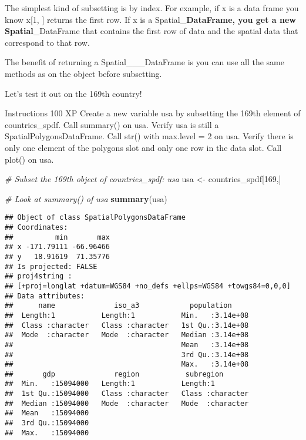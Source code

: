 \documentclass[]{article}
\newenvironment{Shaded}{\begin{snugshade}}{\end{snugshade}}
\newcommand{\CommentTok}[1]{\textcolor[rgb]{0.56,0.35,0.01}{\textit{#1}}}
\newcommand{\DecValTok}[1]{\textcolor[rgb]{0.00,0.00,0.81}{#1}}
\newcommand{\KeywordTok}[1]{\textcolor[rgb]{0.13,0.29,0.53}{\textbf{#1}}}
\newcommand{\NormalTok}[1]{#1}
\newcommand{\StringTok}[1]{\textcolor[rgb]{0.31,0.60,0.02}{#1}}
\begin{document}
The simplest kind of subsetting is by index. For example, if x is a data
frame you know x{[}1, {]} returns the first row. If x is a
Spatial\_\textbf{DataFrame, you get a new Spatial}\_DataFrame that
contains the first row of data and the spatial data that correspond to
that row.

The benefit of returning a Spatial\_\_\_DataFrame is you can use all the
same methods as on the object before subsetting.

Let's test it out on the 169th country!

Instructions 100 XP Create a new variable usa by subsetting the 169th
element of countries\_spdf. Call summary() on usa. Verify usa is still a
SpatialPolygonsDataFrame. Call str() with max.level = 2 on usa. Verify
there is only one element of the polygons slot and only one row in the
data slot. Call plot() on usa.

\begin{Shaded}
\begin{Highlighting}[]
\CommentTok{# Subset the 169th object of countries_spdf: usa}
\NormalTok{usa <-}\StringTok{ }\NormalTok{countries_spdf[}\DecValTok{169}\NormalTok{,]}

\CommentTok{# Look at summary() of usa}
\KeywordTok{summary}\NormalTok{(usa)}
\end{Highlighting}
\end{Shaded}

\begin{verbatim}
## Object of class SpatialPolygonsDataFrame
## Coordinates:
##          min       max
## x -171.79111 -66.96466
## y   18.91619  71.35776
## Is projected: FALSE 
## proj4string :
## [+proj=longlat +datum=WGS84 +no_defs +ellps=WGS84 +towgs84=0,0,0]
## Data attributes:
##      name              iso_a3            population      
##  Length:1           Length:1           Min.   :3.14e+08  
##  Class :character   Class :character   1st Qu.:3.14e+08  
##  Mode  :character   Mode  :character   Median :3.14e+08  
##                                        Mean   :3.14e+08  
##                                        3rd Qu.:3.14e+08  
##                                        Max.   :3.14e+08  
##       gdp              region           subregion        
##  Min.   :15094000   Length:1           Length:1          
##  1st Qu.:15094000   Class :character   Class :character  
##  Median :15094000   Mode  :character   Mode  :character  
##  Mean   :15094000                                        
##  3rd Qu.:15094000                                        
##  Max.   :15094000
\end{verbatim}
\end{document}
